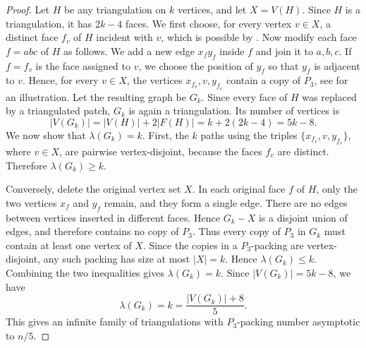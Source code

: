 \documentclass{patmorin}
\begin{document}
\begin{proof}
Let $H$ be any triangulation on $k$ vertices, and let $X=V(H)$.
Since $H$ is a triangulation, it has $2k-4$ faces.
We first choose, for every vertex $v\in X$, a distinct face $f_v$ of $H$
incident with $v$, which is possible by .
Now modify each face $f=abc$ of $H$ as follows. 
We add a new edge $x_fy_f$ inside $f$ and join it to $a,b,c$. 
If $f=f_v$ is the face assigned to
$v$, we choose the position of $y_f$ so that $y_f$ is adjacent to $v$.
Hence, for every $v\in X$, the vertices $x_{f_v},v,y_{f_v}$ contain a copy of $P_3$, see  for an illustration.
Let the resulting graph be $G_k$. 
Since every face of $H$ was replaced by a
triangulated patch, $G_k$ is again a triangulation. Its number of vertices is
\[
|V(G_k)|
=
|V(H)|+2|F(H)|
=
k+2(2k-4)
=
5k-8.
\]
We now show that $\lambda(G_k)=k$.
First, the $k$ paths using the triples
$\{x_{f_v},v,y_{f_v}\}$, where $v\in X$, are pairwise vertex-disjoint,
because the faces $f_v$ are distinct. Therefore $\lambda(G_k)\ge k$.

Conversely, delete the original vertex set $X$. In each original face $f$ of
$H$, only the two vertices $x_f$ and $y_f$ remain, and they form a single edge.
There are no edges between vertices inserted in different faces. Hence
$G_k-X$ is a disjoint union of edges, and therefore contains no copy of $P_3$.
Thus every copy of $P_3$ in $G_k$ must contain at least one vertex of $X$.
Since the copies in a $P_3$-packing are vertex-disjoint, any such packing has
size at most $|X|=k$. Hence $\lambda(G_k)\le k$.
Combining the two inequalities gives $\lambda(G_k)=k$. Since
$|V(G_k)|=5k-8$, we have
\[
\lambda(G_k)=k=\frac{|V(G_k)|+8}{5}.
\]
This gives an infinite family of triangulations with $P_3$-packing number
asymptotic to $n/5$.
\end{proof}
\end{document}
